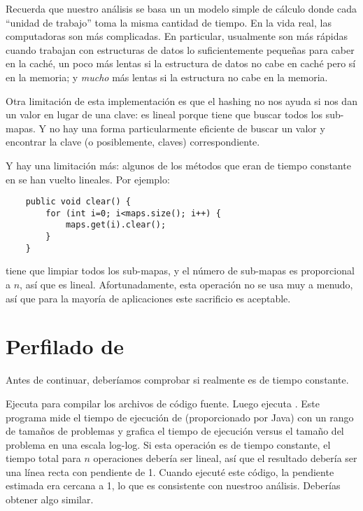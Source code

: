 \documentclass[12pt]{book}
\theoremstyle{exercise}
\begin{document}

Recuerda que nuestro análisis se basa un un modelo simple de cálculo
donde cada ``unidad de trabajo'' toma la misma cantidad de tiempo. En
la vida real, las computadoras son más complicadas. En particular, 
usualmente son más rápidas cuando trabajan con estructuras de datos lo
suficientemente pequeñas para caber en la caché, un poco más lentas si
la estructura de datos no cabe en caché pero sí en la memoria; y \emph{mucho}
más lentas si la estructura no cabe en la memoria.


Otra limitación de esta implementación es que el hashing no nos ayuda
si nos dan un valor en lugar de una clave:  es
lineal porque tiene que buscar todos los sub-mapas. Y no hay una forma
particularmente eficiente de buscar un valor y encontrar la clave (o
posiblemente, claves) correspondiente.


Y hay una limitación más: algunos de los métodos que eran de tiempo
constante en  se han vuelto lineales. Por ejemplo:

\begin{verbatim}
    public void clear() {
        for (int i=0; i<maps.size(); i++) {
            maps.get(i).clear();
        }
    }
\end{verbatim}

 tiene que limpiar todos los sub-mapas, y el número de
sub-mapas es proporcional a $n$, así que es lineal. Afortunadamente,
esta operación no se usa muy a menudo, así que para la mayoría de
aplicaciones este sacrificio es aceptable.



\section{Perfilado de }
\label{profiling-myhashmap}

Antes de continuar, deberíamos comprobar si  realmente
es de tiempo constante.


Ejecuta  para compilar los archivos de código
fuente. Luego ejecuta . Este programa mide el
tiempo de ejecución de  (proporcionado por Java) con un
rango de tamaños de problemas y grafica el tiempo de ejecución versus el
tamaño del problema en una escala log-log. Si esta operación es de
tiempo constante, el tiempo total para $n$ operaciones debería ser
lineal, así que el resultado debería ser una línea recta con pendiente
de 1. Cuando ejecuté este código, la pendiente estimada era cercana a 1,
lo que es consistente con nuestroo análisis. Deberías obtener algo similar.
\end{document}
